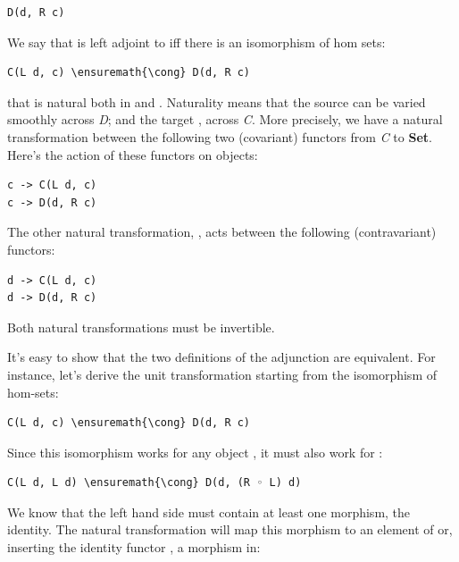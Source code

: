 \begin{Verbatim}[commandchars=\\\{\}]
D(d, R c)
\end{Verbatim}
We say that  is left adjoint to  iff there is an
isomorphism of hom sets:

\begin{Verbatim}[commandchars=\\\{\}]
C(L d, c) \ensuremath{\cong} D(d, R c)
\end{Verbatim}
that is natural both in  and .
Naturality means that the source  can be varied smoothly
across \emph{D}; and the target , across \emph{C}. More
precisely, we have a natural transformation  between the
following two (covariant) functors from \emph{C} to \textbf{Set}. Here's
the action of these functors on objects:

\begin{Verbatim}[commandchars=\\\{\}]
c -> C(L d, c)
c -> D(d, R c)
\end{Verbatim}
The other natural transformation, , acts between the following
(contravariant) functors:

\begin{Verbatim}[commandchars=\\\{\}]
d -> C(L d, c)
d -> D(d, R c)
\end{Verbatim}
Both natural transformations must be invertible.

It's easy to show that the two definitions of the adjunction are
equivalent. For instance, let's derive the unit transformation starting
from the isomorphism of hom-sets:

\begin{Verbatim}[commandchars=\\\{\}]
C(L d, c) \ensuremath{\cong} D(d, R c)
\end{Verbatim}
Since this isomorphism works for any object , it must also
work for :

\begin{Verbatim}[commandchars=\\\{\}]
C(L d, L d) \ensuremath{\cong} D(d, (R ◦ L) d)
\end{Verbatim}
We know that the left hand side must contain at least one morphism, the
identity. The natural transformation will map this morphism to an
element of  or, inserting the identity
functor , a morphism in:

